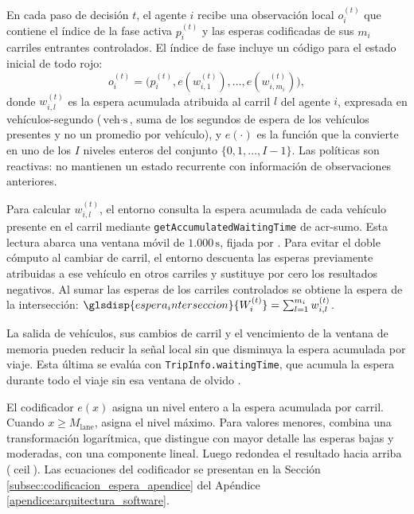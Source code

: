 En cada paso de decisión $t$, el agente $i$ recibe una observación local $o_i^{(t)}$ que contiene el índice de la fase activa $p_i^{(t)}$ y las esperas codificadas de sus $m_i$ carriles entrantes controlados. El índice de fase incluye un código para el estado inicial de todo rojo:
\begin{equation}
 o_i^{(t)}=\bigl(p_i^{(t)},e(w_{i,1}^{(t)}),\ldots,e(w_{i,m_i}^{(t)})\bigr),
 \label{eq:observacion_local_metodologia}
\end{equation}
donde $w_{i,l}^{(t)}$ es la espera acumulada atribuida al carril $l$ del agente $i$, expresada en vehículos-segundo ($\text{veh}\cdot\text{s}$, suma de los segundos de espera de los vehículos presentes y no un promedio por vehículo), y $e(\cdot)$ es la función que la convierte en uno de los $I$ niveles enteros del conjunto $\{0,1,\ldots,I-1\}$. Las políticas son reactivas: no mantienen un estado recurrente con información de observaciones anteriores.

Para calcular $w_{i,l}^{(t)}$, el entorno consulta la espera acumulada de cada vehículo presente en el carril mediante \texttt{getAccumulatedWaitingTime} de \acrshort{acr-sumo}. Esta lectura abarca una ventana móvil de $1.000\,\text{s}$, fijada por  \cite{SUMO2026_TraCIVehicle}. Para evitar el doble cómputo al cambiar de carril, el entorno descuenta las esperas previamente atribuidas a ese vehículo en otros carriles y sustituye por cero los resultados negativos. Al sumar las esperas de los carriles controlados se obtiene la espera de la intersección: $\glsdisp{espera_interseccion}{W_i^{(t)}}=\sum_{l=1}^{m_i}w_{i,l}^{(t)}$.

La salida de vehículos, sus cambios de carril y el vencimiento de la ventana de memoria pueden reducir la señal local sin que disminuya la espera acumulada por viaje. Esta última se evalúa con \texttt{TripInfo.waitingTime}, que acumula la espera durante todo el viaje sin esa ventana de olvido \cite{SUMO2026_TripInfo}.

El codificador $e(x)$ asigna un nivel entero a la espera acumulada por carril. Cuando $x\geq M_{\mathrm{lane}}$, asigna el nivel máximo. Para valores menores, combina una transformación logarítmica, que distingue con mayor detalle las esperas bajas y moderadas, con una componente lineal. Luego redondea el resultado hacia arriba ($\operatorname{ceil}$). Las ecuaciones del codificador se presentan en la Sección \ref{subsec:codificacion_espera_apendice} del Apéndice \ref{apendice:arquitectura_software}.

